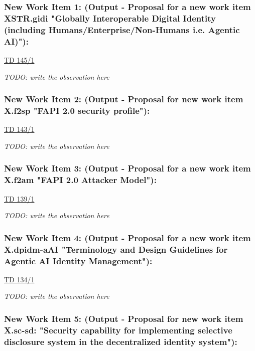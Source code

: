 \subsubsection{New Work Item 1: (Output - Proposal for a new work item XSTR.gidi "Globally Interoperable Digital Identity (including Humans/Enterprise/Non-Humans i.e. Agentic AI)"):}

\href{https://www.itu.int/md/meetingdoc.asp?lang=en\&parent=T25-SG17-251203-TD-WP1-0145}{TD 145/1}

\textit{TODO: write the observation here}

\subsubsection{New Work Item 2: (Output - Proposal for new work item X.f2sp "FAPI 2.0 security profile"):}

\href{https://www.itu.int/md/meetingdoc.asp?lang=en\&parent=T25-SG17-251203-TD-WP1-0143}{TD 143/1}

\textit{TODO: write the observation here}

\subsubsection{New Work Item 3: (Output - Proposal for a new work item X.f2am "FAPI 2.0 Attacker Model"):}

\href{https://www.itu.int/md/meetingdoc.asp?lang=en\&parent=T25-SG17-251203-TD-WP1-0139}{TD 139/1}

\textit{TODO: write the observation here}

\subsubsection{New Work Item 4: (Output - Proposal for a new work item X.dpidm-aAI "Terminology and Design Guidelines for Agentic AI Identity Management"):}

\href{https://www.itu.int/md/meetingdoc.asp?lang=en\&parent=T25-SG17-251203-TD-WP1-0134}{TD 134/1}

\textit{TODO: write the observation here}

\subsubsection{New Work Item 5: (Output - Proposal for new work item X.sc-sd: "Security capability for implementing selective disclosure system in the decentralized identity system"):}


